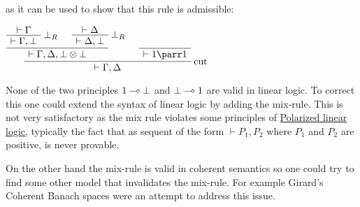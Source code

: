 as it can be used to show that this rule is admissible:

\(\AxRule{\vdash\Gamma}
\LabelRule{\bot_R}
\UnaRule{\vdash\Gamma, \bot}
\AxRule{\vdash\Delta}
\LabelRule{\bot_R}
\UnaRule{\vdash\Delta, \bot}
\BinRule{\vdash \Gamma, \Delta, \bot\tens\bot}
\NulRule{\vdash \one\parr\one}
\LabelRule{\rulename{cut}}
\BinRule{\vdash\Gamma,\Delta}
\DisplayProof\)

None of the two principles \(1\multimap\bot\) and \(\bot\multimap1\) are
valid in linear logic. To correct this one could extend the syntax of
linear logic by adding the mix-rule. This is not very satisfactory as
the mix rule violates some principles of
\href{Polarized_linear_logic}{Polarized linear logic}, typically the
fact that as sequent of the form \(\vdash P_1, P_2\) where \(P_1\) and
\(P_2\) are positive, is never provable.

On the other hand the mix-rule is valid in coherent semantics so one
could try to find some other model that invalidates the mix-rule. For
example Girard's Coherent Banach spaces were an attempt to address this
issue.

